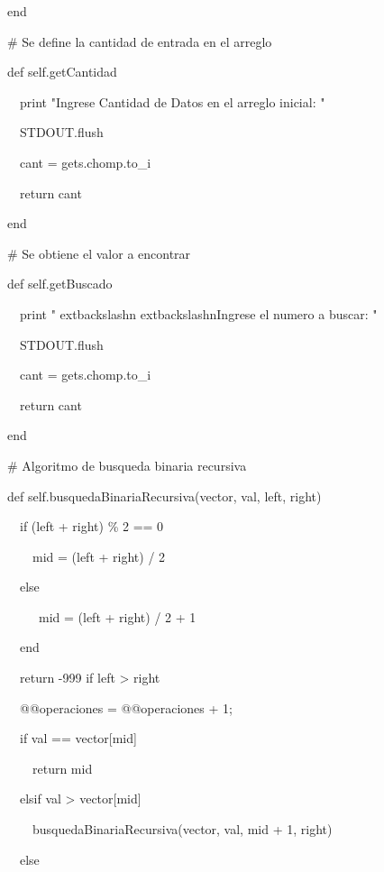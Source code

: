 {\noindent \ \   end

\bigskip 
\noindent \ \   \# Se define la cantidad de entrada en el arreglo

\noindent \ \   def self.getCantidad

\noindent \ \ \ \     print "Ingrese Cantidad de Datos en el arreglo inicial: "

\noindent \ \ \ \     STDOUT.flush

\noindent \ \ \ \     cant = gets.chomp.to\_i

\noindent \ \ \ \     return cant

\noindent \ \   end   

\bigskip 
\noindent \ \   \# Se obtiene el valor a encontrar

\noindent \ \   def self.getBuscado

\noindent \ \ \ \     print "	extbackslashn	extbackslashnIngrese el numero a buscar: "

\noindent \ \ \ \     STDOUT.flush

\noindent \ \ \ \     cant = gets.chomp.to\_i

\noindent \ \ \ \     return cant

\noindent \ \   end   

\bigskip 
\noindent \ \   \# Algoritmo de busqueda binaria recursiva

\noindent \ \   def self.busquedaBinariaRecursiva(vector, val, left, right)

\bigskip 
\noindent \ \ \ \     if (left + right) \% 2 == 0

\noindent \ \ \ \ \ \       mid = (left + right) / 2 

\noindent \ \ \ \     else

\noindent \ \ \ \ \ \ \        mid = (left + right) / 2  + 1 

\noindent \ \ \ \     end

\noindent \ \ \ \     return -999 if left > right

\bigskip 
\noindent \ \ \ \     @@operaciones = @@operaciones + 1;

\bigskip 
\noindent \ \ \ \     if val == vector[mid]

\noindent \ \ \ \ \ \       return mid 

\noindent \ \ \ \     elsif val > vector[mid]

\noindent \ \ \ \ \ \       busquedaBinariaRecursiva(vector, val, mid + 1, right)

\noindent \ \ \ \     else

}
